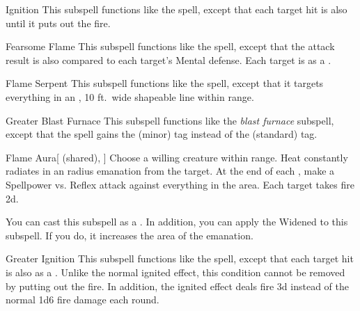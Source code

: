 \begin{ability}[\nth{3}]{Ignition}
This subspell functions like the  spell, except that each target hit is also  until it puts out the fire.
\end{ability}
\vspace{0.25em}


\begin{ability}[\nth{4}]{Fearsome Flame}
This subspell functions like the  spell, except that the attack result is also compared to each target's Mental defense.
\hit Each target is  as a .
\end{ability}
\vspace{0.25em}


\begin{ability}[\nth{4}]{Flame Serpent}
This subspell functions like the  spell, except that it targets everything in an \arealarge, 10 ft.\ wide shapeable line within \rngmed range.
\end{ability}
\vspace{0.25em}


\begin{ability}[\nth{5}]{Greater Blast Furnace}
This subspell functions like the \textit{blast furnace} subspell, except that the spell gains the  (minor) tag instead of the  (standard) tag.
\end{ability}
\vspace{0.25em}


\begin{ability}[\nth{6}]{Flame Aura}[ (shared), ]
Choose a willing creature within \rngclose range.
Heat constantly radiates in an \areamed radius emanation from the target.
At the end of each , make a Spellpower vs. Reflex attack against everything in the area.
\hit Each target takes fire  \minus2d.

You can cast this subspell as a .
In addition, you can apply the Widened  to this subspell.
If you do, it increases the area of the emanation.
\end{ability}
\vspace{0.25em}


\begin{ability}[\nth{6}]{Greater Ignition}
This subspell functions like the  spell, except that each target hit is also  as a .
Unlike the normal ignited effect, this condition cannot be removed by putting out the fire.
In addition, the ignited effect deals fire  \minus3d instead of the normal 1d6 fire damage each round.
\end{ability}
\vspace{0.25em}


